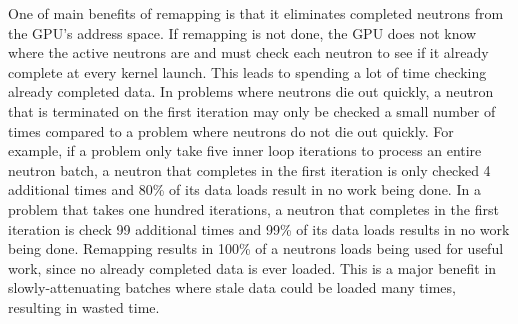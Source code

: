 One of main benefits of remapping is that it eliminates completed neutrons from the GPU's address space.  If remapping is not done, the GPU does not know where the active neutrons are and must check each neutron to see if it already complete at every kernel launch.  This leads to spending a lot of time checking already completed data.  In problems where neutrons die out quickly, a neutron that is terminated on the first iteration may only be checked a small number of times compared to a problem where neutrons do not die out quickly.  For example, if a problem only take five inner loop iterations to process an entire neutron batch, a neutron that completes in the first iteration is only checked 4 additional times and 80\% of its data loads result in no work being done.  In a problem that takes one hundred iterations, a neutron that completes in the first iteration is check 99 additional times and 99\% of its data loads results in no work being done.  Remapping results in 100\% of a neutrons loads being used for useful work, since no already completed data is ever loaded.  This is a major benefit in slowly-attenuating batches where stale data could be loaded many times, resulting in wasted time.  %





